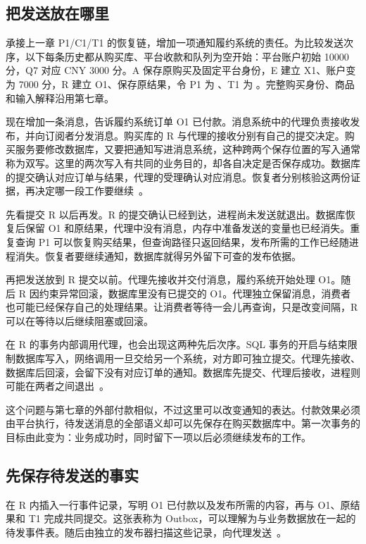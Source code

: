 \subsection*{把发送放在哪里}

承接上一章 P1/C1/T1 的恢复链，增加一项通知履约系统的责任。为比较发送次序，以下每条历史都从购买库、平台收款和队列为空开始：平台账户初始 10000 分，Q7 对应 CNY 3000 分。A 保存原购买及固定平台身份，E 建立 X1、账户变为 7000 分，R 建立 O1、保存原结果，令 P1 为 、T1 为 。完整购买身份、商品和输入解释沿用第七章。

现在增加一条消息，告诉履约系统订单 O1 已付款。消息系统中的代理负责接收发布，并向订阅者分发消息。购买库的 R 与代理的接收分别有自己的提交决定。购买服务要修改数据库，又要把通知写进消息系统，这种跨两个保存位置的写入通常称为双写。这里的两次写入有共同的业务目的，却各自决定是否保存成功。数据库的提交确认对应订单与结果，代理的受理确认对应消息。恢复者分别核验这两份证据，再决定哪一段工作要继续~\cite{outbox}。

先看提交 R 以后再发。R 的提交确认已经到达，进程尚未发送就退出。数据库恢复后保留 O1 和原结果，代理中没有消息，内存中准备发送的变量也已经消失。重复查询 P1 可以恢复购买结果，但查询路径只返回结果，发布所需的工作已经随进程消失。恢复者要继续通知，数据库就得另外留下可查的发布依据。

再把发送放到 R 提交以前。代理先接收并交付消息，履约系统开始处理 O1。随后 R 因约束异常回滚，数据库里没有已提交的 O1。代理独立保留消息，消费者也可能已经保存自己的处理结果。让消费者等待一会儿再查询，只是改变间隔，R 可以在等待以后继续阻塞或回滚。

在 R 的事务内部调用代理，也会出现这两种先后次序。SQL 事务的开启与结束限制数据库写入，网络调用一旦交给另一个系统，对方即可独立提交。代理先接收、数据库后回滚，会留下没有对应订单的通知。数据库先提交、代理后接收，进程则可能在两者之间退出~\cite{outbox}。


这个问题与第七章的外部付款相似，不过这里可以改变通知的表达。付款效果必须由平台执行，待发送消息的全部语义却可以先保存在购买数据库中。第一次事务的目标由此变为：业务成功时，同时留下一项以后必须继续发布的工作。

\subsection*{先保存待发送的事实}

在 R 内插入一行事件记录，写明 O1 已付款以及发布所需的内容，再与 O1、原结果和 T1 完成共同提交。这张表称为 Outbox，可以理解为与业务数据放在一起的待发事件表。随后由独立的发布器扫描这些记录，向代理发送~\cite{outbox}。

